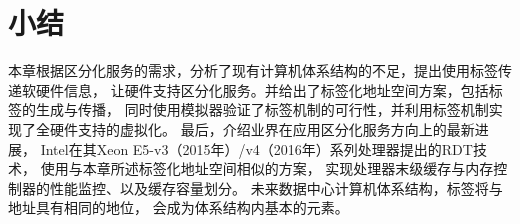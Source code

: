 \section{小结}

本章根据区分化服务的需求，分析了现有计算机体系结构的不足，提出使用标签传递软硬件信息，
让硬件支持区分化服务。并给出了标签化地址空间方案，包括标签的生成与传播，
同时使用模拟器验证了标签机制的可行性，并利用标签机制实现了全硬件支持的虚拟化。
最后，介绍业界在应用区分化服务方向上的最新进展，
Intel在其Xeon E5-v3（2015年）/v4（2016年）系列处理器提出的RDT技术，
使用与本章所述标签化地址空间相似的方案，
实现处理器末级缓存与内存控制器的性能监控、以及缓存容量划分。
未来数据中心计算机体系结构，标签将与地址具有相同的地位，
会成为体系结构内基本的元素。



